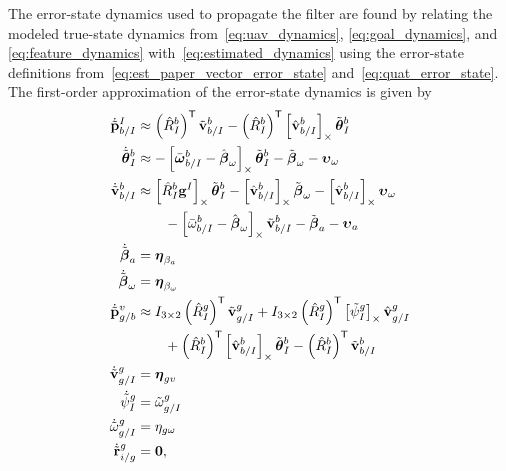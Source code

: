 The error-state dynamics used to propagate the filter are found by relating
the modeled true-state dynamics from~\eqref{eq:uav_dynamics},
\eqref{eq:goal_dynamics}, and \eqref{eq:feature_dynamics}
with~\eqref{eq:estimated_dynamics} using the error-state definitions
from~\eqref{eq:est_paper_vector_error_state} and~\eqref{eq:quat_error_state}. The
first-order approximation of the error-state dynamics is given by 
\begin{align}
  \dot{\tilde{\boldsymbol{\mathrm{p}}}}_{b/I}^I
  &\approx
  \left( \hat{R}_I^b \right)^{\mathsf{T}} \tilde{\boldsymbol{\mathrm{v}}}_{b/I}^b
  - \left( \hat{R}_I^b \right)^{\mathsf{T}} \left[ \hat{\boldsymbol{\mathrm{v}}}_{b/I}^b \right]_{\times}
  \tilde{\boldsymbol{\mathrm{\theta}}}_I^b
  \\
  \dot{\tilde{\boldsymbol{\mathrm{\theta}}}}_{I}^{b} 
  &\approx 	
  -\left[  \bar{\boldsymbol{\mathrm{\omega}}}_{b/I}^b - \hat{\boldsymbol{\mathrm{\beta}}}_\omega \right]_{\times}
    \tilde{\boldsymbol{\mathrm{\theta}}}_I^b
    - \tilde{\boldsymbol{\mathrm{\beta}}}_\omega -
    \boldsymbol{\mathrm{\upsilon}}_\omega
  \nonumber \\
  \dot{\tilde{\boldsymbol{\mathrm{v}}}}_{b/I}^b 
  &\approx
  \left[  \hat{R}_I^b \boldsymbol{\mathrm{g}}^I  \right]_{\times} \tilde{\boldsymbol{\mathrm{\theta}}}_I^b 
  -
  \left[  \hat{\boldsymbol{\mathrm{v}}}_{b/I}^b  \right]_{\times} \tilde{\boldsymbol{\mathrm{\beta}}}_\omega
  -
  \left[  \hat{\boldsymbol{\mathrm{v}}}_{b/I}^b  \right]_{\times} \boldsymbol{\mathrm{\upsilon}}_\omega
  \nonumber \\
  & \qquad -
  \left[  \bar{\omega}_{b/I}^b - \hat{\boldsymbol{\mathrm{\beta}}}_\omega  \right]_{\times}
  \tilde{\boldsymbol{\mathrm{v}}}_{b/I}^b
  -
  \tilde{\boldsymbol{\mathrm{\beta}}}_a
  -
  \boldsymbol{\mathrm{\upsilon}}_a \nonumber
  \\
  \dot{\tilde{\boldsymbol{\mathrm{\beta}}}}_a &= \boldsymbol{\mathrm{\eta}}_{\beta_a} \nonumber
  \\
  \dot{\tilde{\boldsymbol{\mathrm{\beta}}}}_\omega &= \boldsymbol{\mathrm{\eta}}_{\beta_\omega} \nonumber
  \\
  \dot{\tilde{\boldsymbol{\mathrm{p}}}}_{g/b}^{v}
                                  &\approx
  I_{3 \times 2} \left( \hat{R}_{I}^{g} \right)^{\mathsf{T}}
  \tilde{\boldsymbol{\mathrm{v}}}_{g/I}^g
  +
  I_{3 \times 2} \left( \hat{R}_{I}^{g} \right)^{\mathsf{T}}
  \left[  \tilde{\psi}_I^g  \right]_{\times} \hat{\boldsymbol{\mathrm{v}}}_{g/I}^g
  \nonumber \\
  & \qquad +
  \left( \hat{R}_{I}^{b} \right)^{\mathsf{T}} \left[  \hat{\boldsymbol{\mathrm{v}}}_{b/I}^{b}  \right]_{\times} 
  \tilde{\boldsymbol{\mathrm{\theta}}}_I^b
  -
  \left( \hat{R}_{I}^{b} \right)^{\mathsf{T}} \tilde{\boldsymbol{\mathrm{v}}}_{b/I}^{b} \nonumber \\
  \dot{\tilde{\boldsymbol{\mathrm{v}}}}_{g/I}^{g} &= \boldsymbol{\mathrm{\eta}}_{gv} \nonumber \\
  \dot{\tilde{\psi}}_{I}^{g} &= \tilde{\omega}_{g/I}^g \nonumber \\
  \dot{\tilde{\omega}}_{g/I}^{g} &= \eta_{g\omega} \nonumber \\
  \dot{\tilde{\boldsymbol{\mathrm{r}}}}_{i/g}^g &= \boldsymbol{\mathrm{0}}, \nonumber
\end{align}
